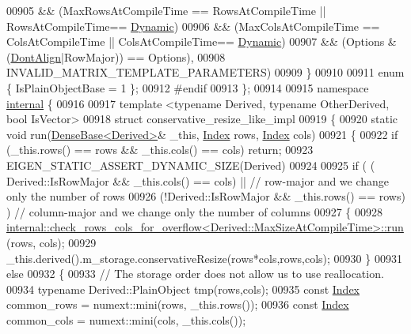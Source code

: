 \begin{DoxyCode}
00905                         && (MaxRowsAtCompileTime == RowsAtCompileTime || RowsAtCompileTime==
      \hyperlink{namespace_eigen_ad81fa7195215a0ce30017dfac309f0b2}{Dynamic})
00906                         && (MaxColsAtCompileTime == ColsAtCompileTime || ColsAtCompileTime==
      \hyperlink{namespace_eigen_ad81fa7195215a0ce30017dfac309f0b2}{Dynamic})
00907                         && (Options & (\hyperlink{group__enums_ggaacded1a18ae58b0f554751f6cdf9eb13a40a452614141522dd313363dbbd65726}{DontAlign}|RowMajor)) == Options),
00908         INVALID\_MATRIX\_TEMPLATE\_PARAMETERS)
00909     \}
00910 
00911     \textcolor{keyword}{enum} \{ IsPlainObjectBase = 1 \};
00912 \textcolor{preprocessor}{#endif}
00913 \};
00914 
00915 \textcolor{keyword}{namespace }\hyperlink{namespaceinternal}{internal} \{
00916 
00917 \textcolor{keyword}{template} <\textcolor{keyword}{typename} Derived, \textcolor{keyword}{typename} OtherDerived, \textcolor{keywordtype}{bool} IsVector>
00918 \textcolor{keyword}{struct }conservative\_resize\_like\_impl
00919 \{
00920   \textcolor{keyword}{static} \textcolor{keywordtype}{void} run(\hyperlink{group___core___module_class_eigen_1_1_dense_base}{DenseBase<Derived>}& \_this, \hyperlink{namespace_eigen_a62e77e0933482dafde8fe197d9a2cfde}{Index} rows, 
      \hyperlink{namespace_eigen_a62e77e0933482dafde8fe197d9a2cfde}{Index} cols)
00921   \{
00922     \textcolor{keywordflow}{if} (\_this.rows() == rows && \_this.cols() == cols) \textcolor{keywordflow}{return};
00923     EIGEN\_STATIC\_ASSERT\_DYNAMIC\_SIZE(Derived)
00924 
00925     \textcolor{keywordflow}{if} ( ( Derived::IsRowMajor && \_this.cols() == cols) || \textcolor{comment}{// row-major and we change only the number of
       rows}
00926          (!Derived::IsRowMajor && \_this.rows() == rows) )  \textcolor{comment}{// column-major and we change only the number of
       columns}
00927     \{
00928       \hyperlink{struct_eigen_1_1internal_1_1check__rows__cols__for__overflow}{internal::check\_rows\_cols\_for\_overflow<Derived::MaxSizeAtCompileTime>::run}
      (rows, cols);
00929       \_this.derived().m\_storage.conservativeResize(rows*cols,rows,cols);
00930     \}
00931     \textcolor{keywordflow}{else}
00932     \{
00933       \textcolor{comment}{// The storage order does not allow us to use reallocation.}
00934       \textcolor{keyword}{typename} Derived::PlainObject tmp(rows,cols);
00935       \textcolor{keyword}{const} \hyperlink{namespace_eigen_a62e77e0933482dafde8fe197d9a2cfde}{Index} common\_rows = numext::mini(rows, \_this.rows());
00936       \textcolor{keyword}{const} \hyperlink{namespace_eigen_a62e77e0933482dafde8fe197d9a2cfde}{Index} common\_cols = numext::mini(cols, \_this.cols());

\end{DoxyCode}
